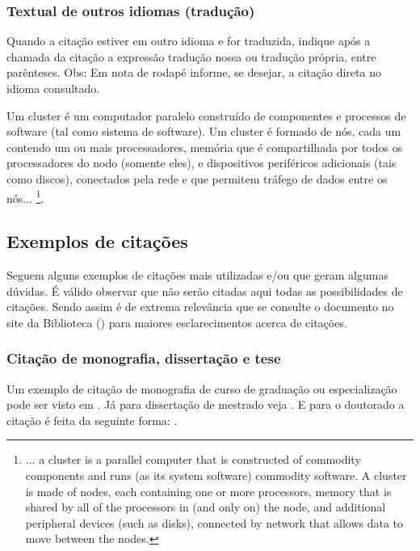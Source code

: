
\subsubsection{\esp Textual de outros idiomas (tradução)}

Quando a citação estiver em outro idioma e for traduzida, indique após a chamada da citação a expressão tradução nossa ou tradução própria, entre parênteses. Obs: Em nota de rodapé informe, se desejar, a citação direta no idioma consultado.

\begin{citacaodireta} 
Um cluster é um computador paralelo construído de componentes e processos de software (tal como sistema de software). 
Um cluster é formado de nós, cada um contendo um ou mais processadores, memória que é compartilhada por todos os processadores do nodo 
(somente eles), e dispositivos periféricos adicionais (tais como discos), conectados pela rede e que permitem tráfego de dados entre os nós...
\cite[p. 10, tradução nossa]{groupp2003}\footnote {... a cluster is a parallel computer that is constructed of commodity  components and runs 
(as its system software) commodity software. A cluster is made of nodes, each 
containing one or more processors, memory that is  shared 
by all of the processors in (and only on) the node, and additional peripheral devices (such as disks), connected by network that allows data to move between the nodes.}.
\end{citacaodireta}
 
\subsection{\esp Exemplos de citações} 

Seguem alguns exemplos de citações mais utilizadas e/ou que geram algumas dúvidas. É válido observar que não serão citadas aqui
todas as possibilidades de citações. Sendo assim é de extrema relevância que se consulte o documento no site da Biblioteca () para maiores esclarecimentos acerca de citações.

\subsubsection{\esp Citação de monografia, dissertação e tese}

Um exemplo de citação de monografia de curso de graduação ou especialização pode ser visto em .
Já para dissertação de mestrado veja . E para o doutorado a citação é feita da seguinte forma: . 



